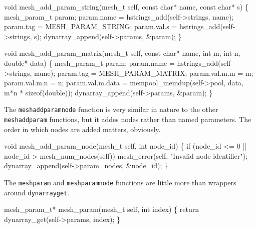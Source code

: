 \nwendcode{}\nwdocspar

\nwenddocs{}\plusendmoddef
void mesh_add_param_string(mesh_t self, const char* name, const char* s)
\{
    mesh_param_t param;
    param.name  = hstrings_add(self->strings, name);
    param.tag   = MESH_PARAM_STRING;
    param.val.s = hstrings_add(self->strings, s);
    dynarray_append(self->params, &param);
\}

\nwendcode{}\nwdocspar

\nwenddocs{}\plusendmoddef
void mesh_add_param_matrix(mesh_t self, const char* name, int m, int n,
                           double* data)
\{
    mesh_param_t param;
    param.name = hstrings_add(self->strings, name);
    param.tag  = MESH_PARAM_MATRIX;
    param.val.m.m = m;
    param.val.m.n = n;
    param.val.m.data = mempool_memdup(self->pool, data, m*n * sizeof(double));
    dynarray_append(self->params, &param);
\}

\nwendcode{}\nwdocspar

The {\tt{}mesh{}add{}param{}node} function is very similar in nature to the
other {\tt{}mesh{}add{}param} functions, but it addes nodes rather than named
parameters.  The order in which nodes are added matters, obviously.

\nwenddocs{}\plusendmoddef
void mesh_add_param_node(mesh_t self, int node_id)
\{
    if (node_id <= 0 || node_id > mesh_num_nodes(self))
        mesh_error(self, "Invalid node identifier");
    dynarray_append(self->param_nodes, &node_id);
\}

\nwendcode{}\nwdocspar

The {\tt{}mesh{}param} and {\tt{}mesh{}param{}node} functions are little
more than wrappers around {\tt{}dynarray{}get}.

\nwenddocs{}\plusendmoddef
mesh_param_t* mesh_param(mesh_t self, int index)
\{
    return dynarray_get(self->params, index);
\}

